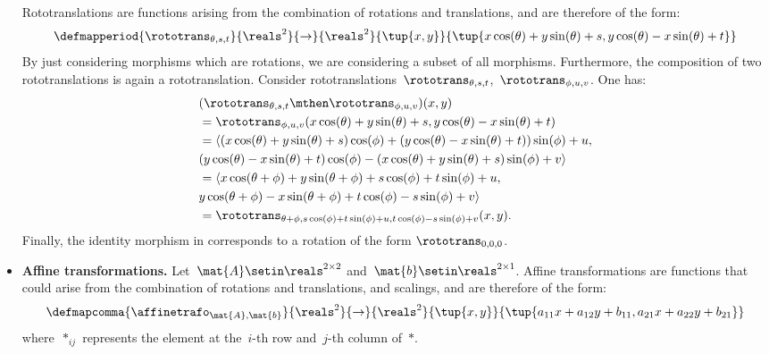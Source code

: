 \begin{solution}
\begin{itemize}
              Rototranslations are functions arising from the combination of rotations and translations, and are therefore of the form:
              \begin{equation}
                  \defmapperiod{\rototrans_{\theta,s,t}}{\reals^2}{\to}{\reals^2}{\tup{x,y}}{\tup{x\cos(\theta)+y\sin(\theta)+s, y\cos(\theta)-x\sin(\theta)+t}}
              \end{equation}
              By just considering morphisms which are rotations, we are considering a subset of all morphisms.
              Furthermore, the composition of two rototranslations is again a rototranslation.
              Consider rototranslations~$\rototrans_{\theta,s,t}$,~$\rototrans_{\phi,u,v}$.
              One has:
              \begin{equation}
                  \begin{aligned}
                       & (\rototrans_{\theta,s,t}\mthen \rototrans_{\phi,u,v})(x,y) \\
                       & =\rototrans_{\phi,u,v}(x\cos(\theta)+y\sin(\theta)+s, y\cos(\theta)-x\sin(\theta)+t) \\
                       & =\langle(x\cos(\theta)+y\sin(\theta)+s)\cos(\phi)+(y\cos(\theta)-x\sin(\theta)+t))\sin(\phi)+u, \\
                       & (y\cos(\theta)-x\sin(\theta)+t)\cos(\phi) - (x\cos(\theta)+y\sin(\theta)+s)\sin(\phi)+v\rangle \\
                       & =\langle x\cos(\theta+\phi)+y\sin(\theta+\phi)+s\cos(\phi)+t\sin(\phi)+u, \\
                       & y\cos(\theta+\phi)-x\sin(\theta+\phi)+t\cos(\phi)-s\sin(\phi)+v\rangle \\
                       & =\rototrans_{\theta+\phi,s\cos(\phi)+t\sin(\phi)+u, t\cos(\phi)-s\sin(\phi)+v}(x,y).
                  \end{aligned}
              \end{equation}
              Finally, the identity morphism in \Draw corresponds to a rotation of the form $\rototrans_{0,0,0}$.
        \item \textbf{Affine transformations.}
              Let~$\mat{A}\setin \reals^{2\times 2}$ and~$\mat{b}\setin \reals^{2\times 1}$.
              Affine transformations are functions that could arise from the combination of rotations and translations, and scalings, and are therefore of the form:
              \begin{equation}
                  \defmapcomma{\affinetrafo_{\mat{A},\mat{b}}}{\reals^2}{\to}{\reals^2}{\tup{x,y}}{\tup{a_{11}x+a_{12}y+b_{11},a_{21}x+a_{22}y+b_{21}}}
              \end{equation}
              where~$*_{ij}$ represents the element at the~$i$-th row and~$j$-th column of~$*$.


\end{itemize}
\end{solution}
